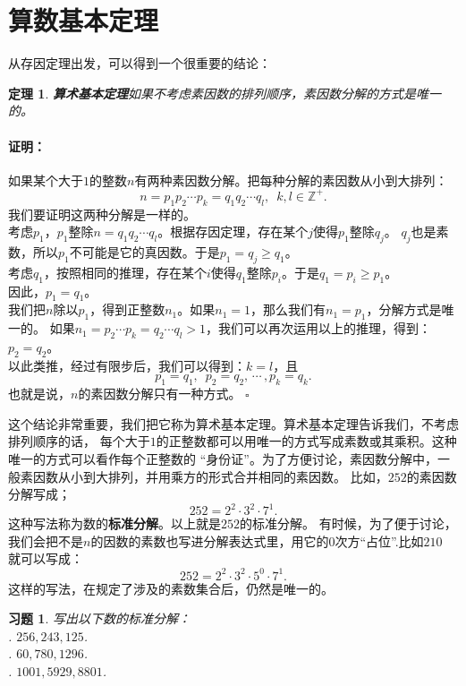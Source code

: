 \documentclass[12pt,UTF8]{ctexbook}
\newtheorem{tm}{定理}[section]
\newenvironment{proof2}{\paragraph{\textbf{证明：}}}{\hfill$\square$}
\newtheorem{xt}{习题}[section]
\begin{document}
\section{算数基本定理}
从存因定理出发，可以得到一个很重要的结论：
\begin{tm}{\textbf{算术基本定理}}\label{tm:1-1-0}
    如果不考虑素因数的排列顺序，素因数分解的方式是唯一的。
\end{tm}
\begin{proof2}
    如果某个大于$1$的整数$n$有两种素因数分解。把每种分解的素因数从小到大排列：
    $$ n = p_1p_2\cdots p_k = q_1q_2\cdots q_l, \,\,\, k, l \in \mathbb{Z}^+.$$
    我们要证明这两种分解是一样的。\\
    考虑$p_1$，$p_1$整除$n = q_1q_2\cdots q_l$。根据存因定理，存在某个$j$使得$p_1$整除$q_j$。
    $q_j$也是素数，所以$p_1$不可能是它的真因数。于是$p_1 = q_j \geqslant q_1$。\\
    考虑$q_1$，按照相同的推理，存在某个$i$使得$q_1$整除$p_i$。于是$q_1 = p_i \geqslant p_1$。\\
    因此，$p_1 = q_1$。\\
    我们把$n$除以$p_1$，得到正整数$n_1$。如果$n_1 = 1$，那么我们有$n_1 = p_1$，分解方式是唯一的。
    如果$n_1 = p_2\cdots p_k = q_2\cdots q_l > 1$，我们可以再次运用以上的推理，得到：$p_2 = q_2$。\\
    以此类推，经过有限步后，我们可以得到：$k=l$，且
    $$p_1 = q_1, \,\,\, p_2 = q_2, \, \cdots \, , p_k = q_k.$$
    也就是说，$n$的素因数分解只有一种方式。
\end{proof2}

这个结论非常重要，我们把它称为算术基本定理。算术基本定理告诉我们，不考虑排列顺序的话，
每个大于$1$的正整数都可以用唯一的方式写成素数或其乘积。这种唯一的方式可以看作每个正整数的
“身份证”。为了方便讨论，素因数分解中，一般素因数从小到大排列，并用乘方的形式合并相同的素因数。
比如，$252$的素因数分解写成；
$$ 252 = 2^2 \cdot 3^2 \cdot 7^1.$$
这种写法称为数的\textbf{标准分解}。以上就是$252$的标准分解。
有时候，为了便于讨论，我们会把不是$n$的因数的素数也写进分解表达式里，用它的$0$次方“占位”.比如$210$
就可以写成：
$$ 252 = 2^2 \cdot 3^2 \cdot 5^0 \cdot 7^1.$$
这样的写法，在规定了涉及的素数集合后，仍然是唯一的。

\begin{xt}\label{xt:1-1-0}
    写出以下数的标准分解：\\
    . $256, 243, 125$.\\
    . $60, 780, 1296$.\\
    . $1001, 5929, 8801$.
\end{xt}
\end{document}
